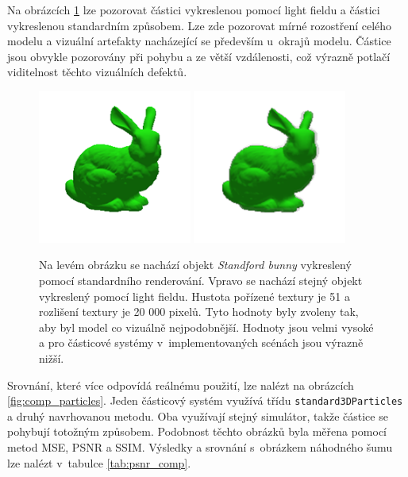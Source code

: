 Na obrázcích \ref{fig:comp_zoomed} lze pozorovat částici vykreslenou pomocí light fieldu a částici vykreslenou standardním způsobem. Lze zde pozorovat mírné rozostření celého modelu a vizuální artefakty nacházející se především u~okrajů modelu. Částice jsou obvykle pozorovány při pohybu a ze větší vzdálenosti, což výrazně potlačí viditelnost těchto vizuálních defektů. 
\begin{figure}[H]
	\centering
	\includegraphics[width=0.45\textwidth]{obrazky-figures/bunny_nolightfield.png}
	\includegraphics[width=0.45\textwidth]{obrazky-figures/bunny_lightfield.png}
	\caption{Na levém obrázku se nachází objekt \emph{Standford bunny} vykreslený pomocí standardního renderování. Vpravo se nachází stejný objekt vykreslený pomocí light fieldu. Hustota pořízené textury je 51 a rozlišení textury je 20 000 pixelů. Tyto hodnoty byly zvoleny tak, aby byl model co vizuálně nejpodobnější. Hodnoty jsou velmi vysoké a pro částicové systémy v~implementovaných scénách jsou výrazně nižší.  }
	\label{fig:comp_zoomed}
\end{figure}
Srovnání, které více odpovídá reálnému použití, lze nalézt na obrázcích \ref{fig:comp_particles}. Jeden částicový systém využívá třídu \texttt{standard3DParticles} a druhý navrhovanou metodu. Oba využívají stejný simulátor, takže částice se pohybují totožným způsobem. Podobnost těchto obrázků byla měřena pomocí metod MSE, PSNR a SSIM. Výsledky a srovnání s~obrázkem náhodného šumu lze nalézt v~tabulce \ref{tab:psnr_comp}.

